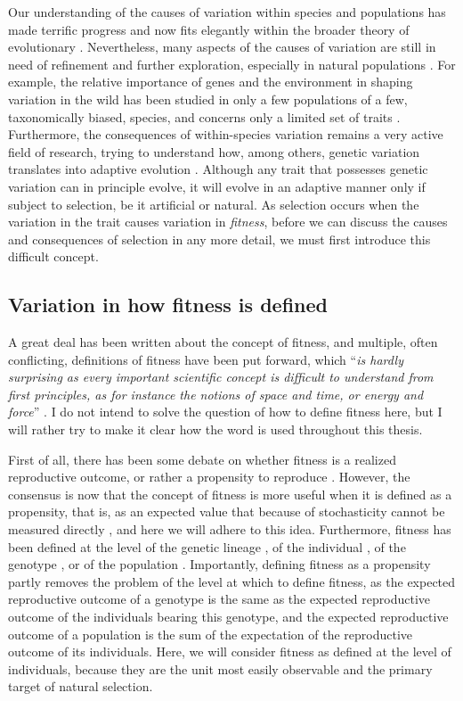 Our understanding of the causes of variation within species and populations has made terrific progress and now fits elegantly within the broader theory of evolutionary \parencite{Pigliucci2010}. Nevertheless, many aspects of the causes of variation are still in need of refinement and further exploration, especially in natural populations \parencite{Kruuk2014}. For example, the relative importance of genes and the environment in shaping variation in the wild has been studied in only a few populations of a few, taxonomically biased, species, and concerns only a limited set of traits \parencite{Lynch1998, Postma2014}. 
Furthermore, the consequences of within-species variation remains a very active field of research, trying to understand how, among others, genetic variation translates into adaptive evolution \parencite{Brookfield2016}.
Although any trait that possesses genetic variation can in principle evolve, it will evolve in an adaptive manner only if subject to selection, be it artificial or natural. As selection occurs when the variation in the trait causes variation in \emph{fitness}, before we can discuss the causes and consequences of selection in any more detail, we must first introduce this difficult concept.

\subsection{Variation in how fitness is defined}
A great deal has been written about the concept of fitness, and multiple, often conflicting, definitions of fitness have been put forward, which  ``\emph{is hardly surprising as every important scientific concept is difficult to understand from first principles, as for instance the notions of space and time, or energy and force}'' \parencite[p. 1358][]{Wagner2010}. I do not intend to solve the question of how to define fitness here, but I will rather try to make it clear how the word is used throughout this thesis.

First of all, there has been some debate on whether fitness is a realized reproductive outcome, or rather a propensity to reproduce \parencite{Brandon1984}. However, the consensus is now that the concept of fitness is more useful when it is defined as a propensity, that is, as an expected value that because of stochasticity cannot be measured directly  \parencite{Brandon1984,Price1996,Krimbas2004}, and here we will adhere to this idea. Furthermore, fitness has been defined at the level of the genetic lineage \parencite[e.g.][]{Akc2016}, of the individual \parencite[e.g.][]{Cam2000}, of the genotype \parencite[e.g.][]{Steiner2012}, or of the population \parencite[e.g.][]{vanTienderen2000}. Importantly, defining fitness as a propensity partly removes the problem of the level at which to define fitness, as the expected reproductive outcome of a genotype is the same as the expected reproductive outcome of the individuals bearing this genotype, and the expected reproductive outcome of a population is the sum of the expectation of the reproductive outcome of its individuals. Here, we will consider fitness as defined at the level of individuals, because they are the unit most easily observable and the primary target of natural selection.

